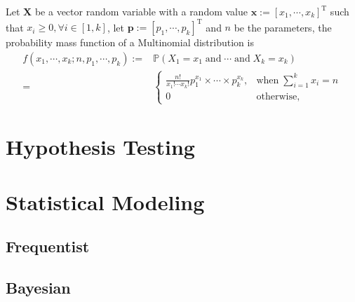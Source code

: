 \begin{defnx}
Let $\mathbf{X}$ be a vector random variable with a random value $\mathbf{x}:=[x_1,\cdots,x_k]^{\text{T}}$ such that $x_i\geq 0,\forall i \in[1,k]$, let $\boldsymbol{p}:=[p_1,\cdots,p_k]^{\text{T}}$ and $n$ be the parameters, the probability mass function of a Multinomial distribution is 
\begin{align}
    f(x_1,\cdots,x_k;n,p_1,\cdots,p_k):=&\mathbb{P}(X_1=x_1\;\text{and}\;\cdots\;\text{and}\;X_k=x_k)\nonumber\\
    =&\begin{cases}
        \displaystyle\frac{n!}{x_1!\cdots x_k!}p_1^{x_1}\times\cdots\times p_k^{x_k},&\text{when}\;\sum_{i=1}^kx_i=n\\
        0&\text{otherwise},
    \end{cases}
\end{align}
\end{defnx}

\section{Hypothesis Testing}
\section{Statistical Modeling}\label{sec:stat_modeling}
\subsection{Frequentist}
\subsection{Bayesian}